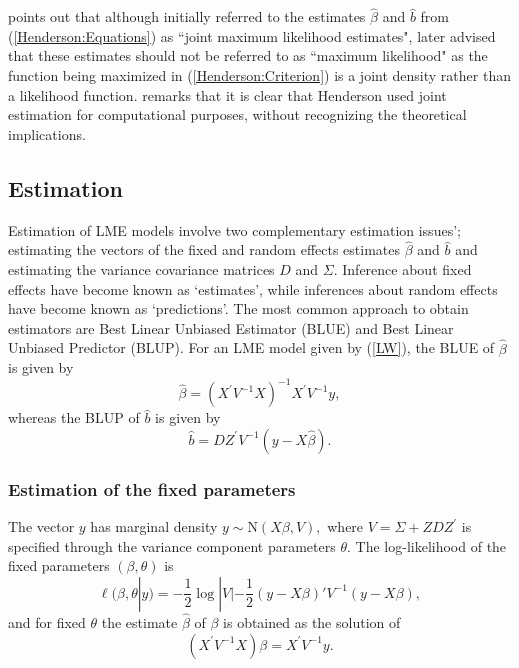 \documentclass[12pt, a4paper]{report}
\theoremstyle{plain}
\theoremstyle{definition}
\theoremstyle{remark}
\begin{document}
\cite{Robi:BLUP:1991} points out that although \cite{Henderson:1950} initially referred to the estimates $\hat{\beta}$ and $\hat{b}$ from (\ref{Henderson:Equations}) as ``joint maximum likelihood estimates", \cite{Henderson:1973} later advised that these estimates should not be referred to as ``maximum likelihood" as the function being maximized in (\ref{Henderson:Criterion}) is a joint density rather than a likelihood function. \cite{Lee:Neld:Pawi:2006} remarks that it is clear that Henderson used joint estimation for computational purposes, without recognizing the theoretical implications.


\newpage
\subsection{Estimation}
Estimation of LME models involve two complementary estimation issues'; estimating the vectors of the fixed and random effects estimates $\hat{\beta}$ and $\hat{b}$ and estimating the variance covariance matrices $D$ and $\Sigma$.
Inference about fixed effects have become known as `estimates', while inferences about random effects have become known as `predictions'. The most common approach to obtain estimators are Best Linear Unbiased Estimator (BLUE) and Best Linear Unbiased Predictor (BLUP). For an LME model given by (\ref{LW}), the BLUE of $\hat{\beta}$ is given by
\[\hat{\beta} = (X^\prime V^{-1}X)^{-1}X^\prime V^{-1}y,\]whereas the BLUP of $\hat{b}$ is given by
\[\hat{b} = DZ^{\prime} V^{-1} (y-X\hat{\beta}).\]

\subsubsection{Estimation of the fixed parameters}

The vector $y$ has marginal density $y \sim \mathrm{N}(X \beta,V),$ where $V = \Sigma + ZDZ^\prime$ is specified through the variance component parameters $\theta.$ The log-likelihood of the fixed parameters $(\beta, \theta)$ is
\begin{equation}
\ell (\beta, \theta|y) =
-\frac{1}{2} \log |V| -\frac{1}{2}(y -
X \beta)'V^{-1}(y -
X \beta), \label{Likelihood:MarginalModel}
\end{equation}
and for fixed $\theta$ the estimate $\hat{\beta}$ of $\beta$ is obtained as the solution of
\begin{equation}
(X^\prime V^{-1}X) {\beta} = X^\prime V^{-1}y.
\label{mle:beta:hat}
\end{equation}
\end{document}
